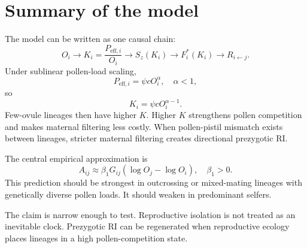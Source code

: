 \documentclass[12pt]{article}
\begin{document}
\section{Summary of the model}

The model can be written as one causal chain:
\begin{equation}
O_i \rightarrow K_i=\frac{P_{\mathrm{eff},i}}{O_i} \rightarrow S_z(K_i) \rightarrow
F_i^*(K_i) \rightarrow R_{i\leftarrow j}.
\end{equation}
Under sublinear pollen-load scaling,
\begin{equation}
P_{\mathrm{eff},i}=\psi cO_i^\alpha,\quad \alpha<1,
\end{equation}
so
\begin{equation}
K_i=\psi cO_i^{\alpha-1}.
\end{equation}
Few-ovule lineages then have higher $K$. Higher $K$ strengthens pollen competition and makes maternal filtering less costly. When pollen-pistil mismatch exists between lineages, stricter maternal filtering creates directional prezygotic RI.

The central empirical approximation is
\begin{equation}
A_{ij}\approx \beta_1G_{ij}(\log O_j-\log O_i),
\quad \beta_1>0.
\end{equation}
This prediction should be strongest in outcrossing or mixed-mating lineages with genetically diverse pollen loads. It should weaken in predominant selfers.

\begin{conclusionbox}
The claim is narrow enough to test. Reproductive isolation is not treated as an inevitable clock. Prezygotic RI can be regenerated when reproductive ecology places lineages in a high pollen-competition state.
\end{conclusionbox}

\newpage
{}
\end{document}
